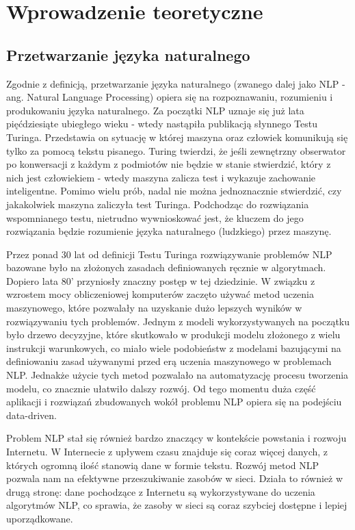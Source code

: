 \chapter{Wprowadzenie teoretyczne}
\label{cha:wprowadzenieTeoretyczne}


\section{Przetwarzanie języka naturalnego}
\label{sec:przetwarzanieJezykaNaturalnego}


Zgodnie z definicją, przetwarzanie języka naturalnego (zwanego dalej jako NLP - ang. Natural Language Processing) opiera się na rozpoznawaniu, rozumieniu i produkowaniu języka naturalnego. Za początki NLP uznaje się już lata pięćdziesiąte ubiegłego wieku - wtedy nastąpiła publikacją słynnego Testu Turinga. Przedstawia on sytuację w której maszyna oraz człowiek komunikują się tylko za pomocą tekstu pisanego. Turing twierdzi, że jeśli zewnętrzny obserwator po konwersacji z każdym z podmiotów nie będzie w stanie stwierdzić, który z nich jest człowiekiem - wtedy maszyna zalicza test i wykazuje zachowanie inteligentne. Pomimo wielu prób, nadal nie można jednoznacznie stwierdzić, czy jakakolwiek maszyna zaliczyła test Turinga. Podchodząc do rozwiązania wspomnianego testu, nietrudno wywnioskować jest, że kluczem do jego rozwiązania będzie rozumienie języka naturalnego (ludzkiego) przez maszynę. 

Przez ponad 30 lat od definicji Testu Turinga rozwiązywanie problemów NLP bazowane było na złożonych zasadach definiowanych ręcznie w algorytmach. Dopiero lata 80’ przyniosły znaczny postęp w tej dziedzinie. W związku z wzrostem mocy obliczeniowej komputerów zaczęto używać metod uczenia maszynowego, które pozwalały na uzyskanie dużo lepszych wyników w rozwiązywaniu tych problemów. Jednym z modeli wykorzystywanych na początku było drzewo decyzyjne, które skutkowało w produkcji modelu złożonego z wielu instrukcji warunkowych, co miało wiele podobieństw z modelami bazującymi na definiowaniu zasad używanymi przed erą uczenia maszynowego w problemach NLP. Jednakże użycie tych metod pozwalało na automatyzację procesu tworzenia modelu, co znacznie ułatwiło dalszy rozwój. Od tego momentu duża część aplikacji i rozwiązań zbudowanych wokół problemu NLP opiera się na podejściu data-driven.

Problem NLP stał się również bardzo znaczący w kontekście powstania i rozwoju Internetu. W Internecie z upływem czasu znajduje się coraz więcej danych, z których ogromną ilość stanowią dane w formie tekstu. Rozwój metod NLP pozwala nam na efektywne przeszukiwanie zasobów w sieci. Działa to również w drugą stronę: dane pochodzące z Internetu są wykorzystywane do uczenia algorytmów NLP, co sprawia, że zasoby w sieci są coraz szybciej dostępne i lepiej uporządkowane.

